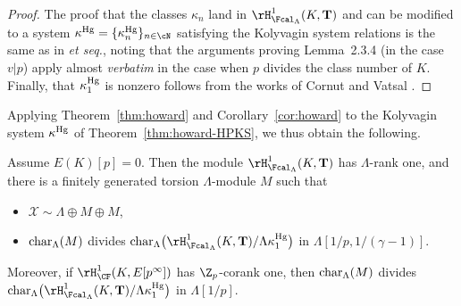 \begin{proof}
The proof that the classes  $\kappa_n$ land in $\rH^1_{\Fcal_\Lambda}(K,\mathbf{T})$ and can be modified to a system $\kappa^{\rm Hg}=\{\kappa_n^{\rm Hg}\}_{n\in\cN}$ satisfying the Kolyvagin system relations is the same as in \cite[Lem.~2.3.4]{howard} \emph{et seq.}, noting that the arguments proving Lemma~2.3.4 (in the case $v\vert p$) apply almost \emph{verbatim} in the case when $p$ divides the class number of $K$. Finally, that $\kappa_1^{\rm Hg}$ is nonzero follows from the works of Cornut and Vatsal \cite{cornut,vatsal}.
\end{proof}

Applying Theorem~\ref{thm:howard} and Corollary~\ref{cor:howard} to the Kolyvagin system $\kappa^{\rm Hg}$ of Theorem~\ref{thm:howard-HPKS}, we thus obtain the following.

\begin{theorem}
\notready\label{thm:howard-HP}
Assume $E(K)[p]=0$. Then the module $\rH^1_{\Fcal_\Lambda}(K,\mathbf{T})$ has $\Lambda$-rank one, and there is a finitely generated torsion $\Lambda$-module $M$ such that
\begin{itemize}
\item[(i)] $\mathcal{X}\sim\Lambda\oplus M\oplus M$,
\item[(ii)] ${\rm char}_\Lambda(M)$ divides ${\rm char}_\Lambda\bigl(\rH^1_{\Fcal_\Lambda}(K,\mathbf{T})/\Lambda\kappa_1^{\rm Hg}\bigr)$ in $\Lambda[1/p,1/(\gamma-1)]$.
\end{itemize}
Moreover, if $\rH^1_{\CF}(K,E[p^\infty])$ has $\Z_p$-corank one,  then ${\rm char}_\Lambda(M)$ divides ${\rm char}_\Lambda\bigl(\rH^1_{\Fcal_\Lambda}(K,\mathbf{T})/\Lambda\kappa_1^{\rm Hg}\bigr)$ in $\Lambda[1/p]$.
\end{theorem}

